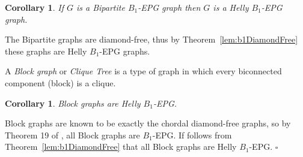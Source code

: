 \documentclass[9pt]{entcs}
\newtheorem{coro}[thm]{Corollary}%
\begin{document}


\begin{coro}
If $G$ is a Bipartite $B_1$-EPG graph then $G$ is a Helly $B_1$-EPG graph.
\end{coro}

\begin{pf}
The Bipartite graphs are diamond-free, thus by Theorem~\ref{lem:b1DiamondFree} these graphs are Helly $B_1$-EPG graphs.
\end{pf}



A \textit{Block graph} or \textit{Clique Tree} is a type of graph in which every biconnected component (block) is a clique.


\begin{coro}\label{lem:cdf}
 Block graphs are Helly $B_1$-EPG.
\end{coro}

\begin{pf}
Block graphs are known to be exactly the chordal diamond-free graphs, so by   Theorem 19 of \cite{ries2009}, all Block graphs are  $B_1$-EPG. If follows from Theorem~\ref{lem:b1DiamondFree} that all Block graphs are Helly $B_1$-EPG. 
 $\square$\end{pf} 

\end{document}

